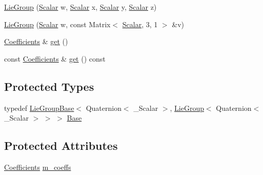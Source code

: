 \begin{DoxyCompactItemize}
\item 
\hyperlink{class_lie_group_3_01_quaternion_3_01___scalar_01_4_01_4_ae14ff68d6699e47d32bedc863725ce40}{Lie\+Group} (\hyperlink{class_lie_group_3_01_quaternion_3_01___scalar_01_4_01_4_a5c9cc4f61c2a1870f44da7951225dc4e}{Scalar} w, \hyperlink{class_lie_group_3_01_quaternion_3_01___scalar_01_4_01_4_a5c9cc4f61c2a1870f44da7951225dc4e}{Scalar} x, \hyperlink{class_lie_group_3_01_quaternion_3_01___scalar_01_4_01_4_a5c9cc4f61c2a1870f44da7951225dc4e}{Scalar} y, \hyperlink{class_lie_group_3_01_quaternion_3_01___scalar_01_4_01_4_a5c9cc4f61c2a1870f44da7951225dc4e}{Scalar} z)
\item 
\hyperlink{class_lie_group_3_01_quaternion_3_01___scalar_01_4_01_4_a6526f663ef495eab03b24a2a97ff6df2}{Lie\+Group} (\hyperlink{class_lie_group_3_01_quaternion_3_01___scalar_01_4_01_4_a5c9cc4f61c2a1870f44da7951225dc4e}{Scalar} w, const Matrix$<$ \hyperlink{class_lie_group_3_01_quaternion_3_01___scalar_01_4_01_4_a5c9cc4f61c2a1870f44da7951225dc4e}{Scalar}, 3, 1 $>$ \&v)
\item 
\hyperlink{class_lie_group_3_01_quaternion_3_01___scalar_01_4_01_4_a80504cfb3bcbf55c7d4c1e377ef9f782}{Coefficients} \& \hyperlink{class_lie_group_3_01_quaternion_3_01___scalar_01_4_01_4_aec4805ed17f1c1ce893bcfdd8776deb2}{get} ()
\item 
const \hyperlink{class_lie_group_3_01_quaternion_3_01___scalar_01_4_01_4_a80504cfb3bcbf55c7d4c1e377ef9f782}{Coefficients} \& \hyperlink{class_lie_group_3_01_quaternion_3_01___scalar_01_4_01_4_a81591117317bb7817883ce137bae5ec3}{get} () const
\end{DoxyCompactItemize}
\subsection*{Protected Types}
\begin{DoxyCompactItemize}
\item 
typedef \hyperlink{class_lie_group_base}{Lie\+Group\+Base}$<$ Quaternion$<$ \+\_\+\+Scalar $>$, \hyperlink{class_lie_group}{Lie\+Group}$<$ Quaternion$<$ \+\_\+\+Scalar $>$ $>$ $>$ \hyperlink{class_lie_group_3_01_quaternion_3_01___scalar_01_4_01_4_a08877e48ca8072baeeed20cedb358b8c}{Base}
\end{DoxyCompactItemize}
\subsection*{Protected Attributes}
\begin{DoxyCompactItemize}
\item 
\hyperlink{class_lie_group_3_01_quaternion_3_01___scalar_01_4_01_4_a80504cfb3bcbf55c7d4c1e377ef9f782}{Coefficients} \hyperlink{class_lie_group_3_01_quaternion_3_01___scalar_01_4_01_4_a8bf670b6608a4fa3139244167131925f}{m\+\_\+coeffs}
\end{DoxyCompactItemize}
